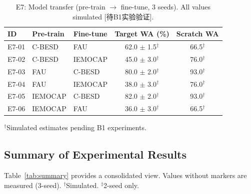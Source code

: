 \begin{table}[t]
\centering
\caption{E7: Model transfer (pre-train $\rightarrow$ fine-tune, 3 seeds). All values simulated [待B1实验验证].}
\label{tab:e7}
\begin{tabular}{lllcc}
\toprule
\textbf{ID} & \textbf{Pre-train} & \textbf{Fine-tune} & \textbf{Target WA (\%)} & \textbf{Scratch WA} \\
\midrule
E7-01 & C-BESD & FAU    & 62.0 $\pm$ 1.5$^\dagger$ & 66.5$^\dagger$ \\
E7-02 & C-BESD & IEMOCAP& 45.0 $\pm$ 3.0$^\dagger$ & 76.0$^\dagger$ \\
E7-03 & FAU    & C-BESD & 80.0 $\pm$ 2.0$^\dagger$ & 93.0$^\dagger$ \\
E7-04 & FAU    & IEMOCAP& 38.0 $\pm$ 3.0$^\dagger$ & 76.0$^\dagger$ \\
E7-05 & IEMOCAP& C-BESD & 82.0 $\pm$ 2.0$^\dagger$ & 93.0$^\dagger$ \\
E7-06 & IEMOCAP& FAU    & 36.0 $\pm$ 3.0$^\dagger$ & 66.5$^\dagger$ \\
\bottomrule
\end{tabular}
\end{table}

\noindent$^\dagger$Simulated estimates pending B1 experiments.

\subsection{Summary of Experimental Results}
\label{ssec:summary}

Table~\ref{tab:summary} provides a consolidated view. Values without markers are
measured (3-seed). $^\dagger$Simulated. $^\ddagger$2-seed only.

